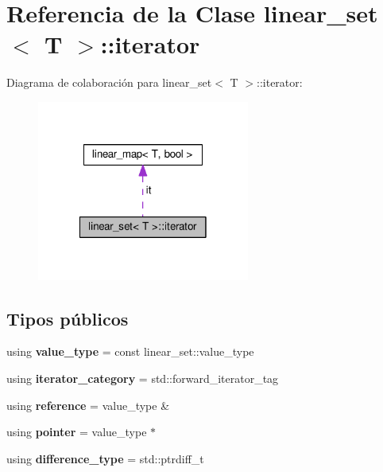 \hypertarget{classlinear__set_1_1iterator}{\section{Referencia de la Clase linear\-\_\-set$<$ T $>$\-:\-:iterator}
\label{classlinear__set_1_1iterator}
}


Diagrama de colaboración para linear\-\_\-set$<$ T $>$\-:\-:iterator\-:
\nopagebreak
\begin{figure}[H]
\begin{center}
\leavevmode
\includegraphics[width=198pt]{classlinear__set_1_1iterator__coll__graph}
\end{center}
\end{figure}
\subsection*{Tipos públicos}
\begin{DoxyCompactItemize}
\item 
\hypertarget{classlinear__set_1_1iterator_adc428ae224f2e66cded571df340b814e}{using {\bfseries value\-\_\-type} = const linear\-\_\-set\-::value\-\_\-type}\label{classlinear__set_1_1iterator_adc428ae224f2e66cded571df340b814e}

\item 
\hypertarget{classlinear__set_1_1iterator_ac70b54cbde97e1a59bc002979633aa41}{using {\bfseries iterator\-\_\-category} = std\-::forward\-\_\-iterator\-\_\-tag}\label{classlinear__set_1_1iterator_ac70b54cbde97e1a59bc002979633aa41}

\item 
\hypertarget{classlinear__set_1_1iterator_a1394508ada8427ad0b5764794ea59473}{using {\bfseries reference} = value\-\_\-type \&}\label{classlinear__set_1_1iterator_a1394508ada8427ad0b5764794ea59473}

\item 
\hypertarget{classlinear__set_1_1iterator_a4334a22789e11ff18a1b31982a20f944}{using {\bfseries pointer} = value\-\_\-type $\ast$}\label{classlinear__set_1_1iterator_a4334a22789e11ff18a1b31982a20f944}

\item 
\hypertarget{classlinear__set_1_1iterator_aca6addc2ad85f15d075c225c4ad3a085}{using {\bfseries difference\-\_\-type} = std\-::ptrdiff\-\_\-t}\label{classlinear__set_1_1iterator_aca6addc2ad85f15d075c225c4ad3a085}

\end{DoxyCompactItemize}

